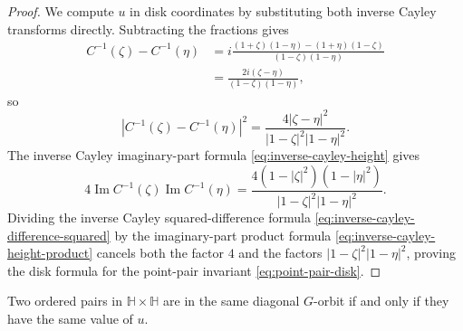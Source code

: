 \begin{proof}
We compute $u$ in disk coordinates by substituting both inverse Cayley transforms directly. Subtracting the fractions gives
\[
 \begin{aligned}
 C^{-1}(\zeta)-C^{-1}(\eta)
 &=i\frac{(1+\zeta)(1-\eta)-(1+\eta)(1-\zeta)}
           {(1-\zeta)(1-\eta)}\\
 &=\frac{2i(\zeta-\eta)}{(1-\zeta)(1-\eta)},
 \end{aligned}
\]
so
\begin{equation}\label{eq:inverse-cayley-difference-squared}
 |C^{-1}(\zeta)-C^{-1}(\eta)|^2
 =\frac{4|\zeta-\eta|^2}{|1-\zeta|^2|1-\eta|^2}.
\end{equation}
The inverse Cayley imaginary-part formula \eqref{eq:inverse-cayley-height} gives
\begin{equation}\label{eq:inverse-cayley-height-product}
 4\operatorname{Im}C^{-1}(\zeta)\operatorname{Im}C^{-1}(\eta)
 =\frac{4(1-|\zeta|^2)(1-|\eta|^2)}{|1-\zeta|^2|1-\eta|^2}.
\end{equation}
Dividing the inverse Cayley squared-difference formula \eqref{eq:inverse-cayley-difference-squared} by the imaginary-part product formula \eqref{eq:inverse-cayley-height-product} cancels both the factor $4$ and the factors $|1-\zeta|^2|1-\eta|^2$, proving the disk formula for the point-pair invariant \eqref{eq:point-pair-disk}.
\end{proof}

\begin{proposition}\label{hyperbolic.pair-orbits}
Two ordered pairs in $\mathbb H\times\mathbb H$ are in the same diagonal $G$-orbit if and only if they have the same value of $u$.
\end{proposition}

